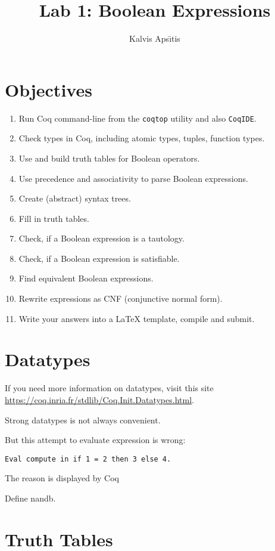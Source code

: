 \documentclass[jou]{apa6}
\title{Lab 1: Boolean Expressions}
\author{Kalvis Aps\={\i}tis}
\affiliation{RBS}
\begin{document}
\maketitle


\section{Objectives}

\begin{enumerate}
\item Run Coq command-line from the {\tt coqtop} utility and also {\tt CoqIDE}.
\item Check types in Coq, including atomic types, tuples, function types.
\item Use and build truth tables for Boolean operators.
\item Use precedence and associativity to parse Boolean expressions.
\item Create (abstract) syntax trees.
\item Fill in truth tables.
\item Check, if a Boolean expression is a tautology.
\item Check, if a Boolean expression is satisfiable.
\item Find equivalent Boolean expressions.
\item Rewrite expressions as CNF (conjunctive normal form).
\item Write your answers into a LaTeX template, compile and submit.
\end{enumerate}


\section{Datatypes}

If you need more information on datatypes, visit this site \url{https://coq.inria.fr/stdlib/Coq.Init.Datatypes.html}. 

Strong datatypes is not always convenient. 

But this attempt to evaluate expression is wrong:
\begin{verbatim}
Eval compute in if 1 = 2 then 3 else 4.
\end{verbatim}
The reason is displayed by Coq \textendash{} 

Define nandb. 



\section{Truth Tables}
\end{document}
